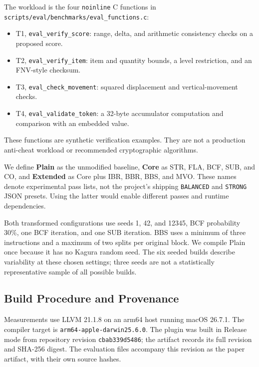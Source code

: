 \documentclass[conference]{IEEEtran}
\begin{document}
The workload is the four \texttt{noinline} C functions in
\texttt{scripts/eval/benchmarks/eval\_functions.c}:
\begin{itemize}
  \item T1, \texttt{eval\_verify\_score}: range, delta, and arithmetic
        consistency checks on a proposed score.
  \item T2, \texttt{eval\_verify\_item}: item and quantity bounds,
        a level restriction, and an FNV-style checksum.
  \item T3, \texttt{eval\_check\_movement}: squared displacement and
        vertical-movement checks.
  \item T4, \texttt{eval\_validate\_token}: a 32-byte accumulator
        computation and comparison with an embedded value.
\end{itemize}
These functions are synthetic verification examples. They are not a
production anti-cheat workload or recommended cryptographic algorithms.

We define \textbf{Plain} as the unmodified baseline, \textbf{Core} as
STR, FLA, BCF, SUB, and CO, and \textbf{Extended} as Core plus IBR,
BBR, BBS, and MVO. These names denote experimental pass lists, not the
project's shipping \texttt{BALANCED} and \texttt{STRONG} JSON presets.
Using the latter would enable different passes and runtime dependencies.

Both transformed configurations use seeds 1, 42, and 12345, BCF
probability 30\%, one BCF iteration, and one SUB iteration. BBS uses a
minimum of three instructions and a maximum of two splits per original
block. We compile Plain once because it has no Kagura random seed.
The six seeded builds describe variability at these chosen settings;
three seeds are not a statistically representative sample of all
possible builds.

\subsection{Build Procedure and Provenance}

Measurements use LLVM 21.1.8 on an arm64 host running macOS 26.7.1.
The compiler target is \texttt{arm64-apple-darwin25.6.0}. The plugin
was built in Release mode from repository revision
\texttt{cbab339d5486}; the artifact records its full revision and
SHA-256 digest. The evaluation files accompany this revision as the
paper artifact, with their own source hashes.
\end{document}
